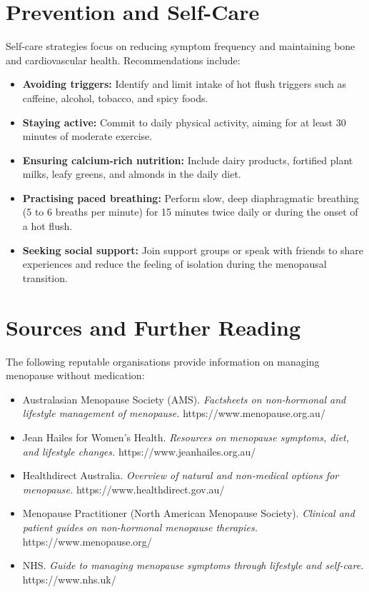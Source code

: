 \section*{Prevention and Self-Care}
Self-care strategies focus on reducing symptom frequency and maintaining bone and cardiovascular health. Recommendations include:
\begin{itemize}
    \item \textbf{Avoiding triggers:} Identify and limit intake of hot flush triggers such as caffeine, alcohol, tobacco, and spicy foods.
    \item \textbf{Staying active:} Commit to daily physical activity, aiming for at least 30 minutes of moderate exercise.
    \item \textbf{Ensuring calcium-rich nutrition:} Include dairy products, fortified plant milks, leafy greens, and almonds in the daily diet.
    \item \textbf{Practising paced breathing:} Perform slow, deep diaphragmatic breathing (5 to 6 breaths per minute) for 15 minutes twice daily or during the onset of a hot flush.
    \item \textbf{Seeking social support:} Join support groups or speak with friends to share experiences and reduce the feeling of isolation during the menopausal transition.
\end{itemize}

\section*{Sources and Further Reading}
The following reputable organisations provide information on managing menopause without medication:
\begin{itemize}
    \item Australasian Menopause Society (AMS). \textit{Factsheets on non-hormonal and lifestyle management of menopause.} https://www.menopause.org.au/
    \item Jean Hailes for Women's Health. \textit{Resources on menopause symptoms, diet, and lifestyle changes.} https://www.jeanhailes.org.au/
    \item Healthdirect Australia. \textit{Overview of natural and non-medical options for menopause.} https://www.healthdirect.gov.au/
    \item Menopause Practitioner (North American Menopause Society). \textit{Clinical and patient guides on non-hormonal menopause therapies.} https://www.menopause.org/
    \item NHS. \textit{Guide to managing menopause symptoms through lifestyle and self-care.} https://www.nhs.uk/
\end{itemize}
